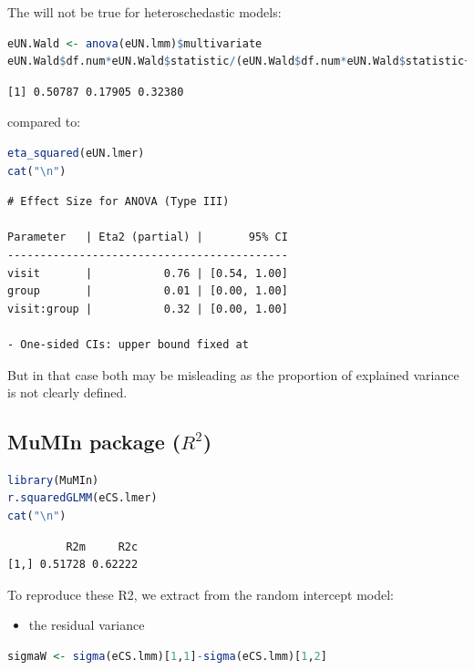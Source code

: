 \documentclass[12pt]{article}
\begin{document}
The will not be true for heteroschedastic models:
\begin{lstlisting}[language=r,numbers=none]
eUN.Wald <- anova(eUN.lmm)$multivariate
eUN.Wald$df.num*eUN.Wald$statistic/(eUN.Wald$df.num*eUN.Wald$statistic+eUN.Wald$df.denom)
\end{lstlisting}

\label{}
\begin{verbatim}
[1] 0.50787 0.17905 0.32380
\end{verbatim}


compared to:
\begin{lstlisting}[language=r,numbers=none]
eta_squared(eUN.lmer)
cat("\n")
\end{lstlisting}

\label{}
\begin{verbatim}
# Effect Size for ANOVA (Type III)

Parameter   | Eta2 (partial) |       95% CI
-------------------------------------------
visit       |           0.76 | [0.54, 1.00]
group       |           0.01 | [0.00, 1.00]
visit:group |           0.32 | [0.00, 1.00]

- One-sided CIs: upper bound fixed at
\end{verbatim}


But in that case both may be misleading as the proportion of explained
variance is not clearly defined.
\subsection{MuMIn package (\(R^2\))}
\label{sec:org7b95dfd}

\begin{lstlisting}[language=r,numbers=none]
library(MuMIn)
r.squaredGLMM(eCS.lmer)
cat("\n")
\end{lstlisting}

\label{}
\begin{verbatim}
         R2m     R2c
[1,] 0.51728 0.62222
\end{verbatim}


To reproduce these R2, we extract from the random intercept model:
\begin{itemize}
\item the residual variance
\end{itemize}
\begin{lstlisting}[language=r,numbers=none]
sigmaW <- sigma(eCS.lmm)[1,1]-sigma(eCS.lmm)[1,2]
\end{lstlisting}
\end{document}
